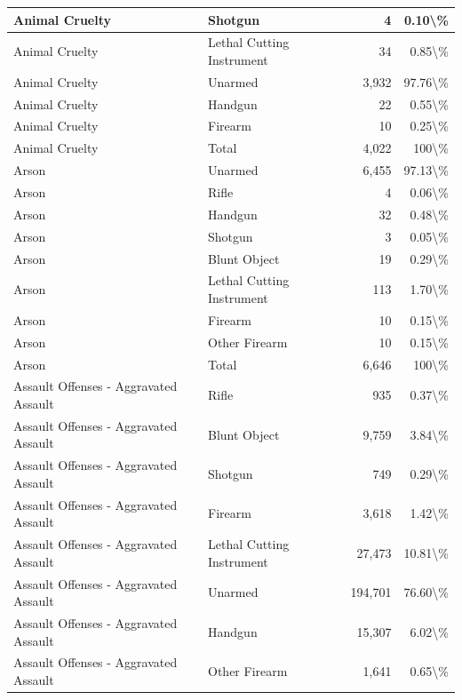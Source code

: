 \documentclass[
]{krantz}
\begin{document}
\begin{longtable}[t]{l|l|r|r}
\hline
Animal Cruelty & Shotgun & 4 & 0.10\textbackslash{}\%\\
\hline
Animal Cruelty & Lethal Cutting Instrument & 34 & 0.85\textbackslash{}\%\\
\hline
Animal Cruelty & Unarmed & 3,932 & 97.76\textbackslash{}\%\\
\hline
Animal Cruelty & Handgun & 22 & 0.55\textbackslash{}\%\\
\hline
Animal Cruelty & Firearm & 10 & 0.25\textbackslash{}\%\\
\hline
Animal Cruelty & Total & 4,022 & 100\textbackslash{}\%\\
\hline
Arson & Unarmed & 6,455 & 97.13\textbackslash{}\%\\
\hline
Arson & Rifle & 4 & 0.06\textbackslash{}\%\\
\hline
Arson & Handgun & 32 & 0.48\textbackslash{}\%\\
\hline
Arson & Shotgun & 3 & 0.05\textbackslash{}\%\\
\hline
Arson & Blunt Object & 19 & 0.29\textbackslash{}\%\\
\hline
Arson & Lethal Cutting Instrument & 113 & 1.70\textbackslash{}\%\\
\hline
Arson & Firearm & 10 & 0.15\textbackslash{}\%\\
\hline
Arson & Other Firearm & 10 & 0.15\textbackslash{}\%\\
\hline
Arson & Total & 6,646 & 100\textbackslash{}\%\\
\hline
Assault Offenses - Aggravated Assault & Rifle & 935 & 0.37\textbackslash{}\%\\
\hline
Assault Offenses - Aggravated Assault & Blunt Object & 9,759 & 3.84\textbackslash{}\%\\
\hline
Assault Offenses - Aggravated Assault & Shotgun & 749 & 0.29\textbackslash{}\%\\
\hline
Assault Offenses - Aggravated Assault & Firearm & 3,618 & 1.42\textbackslash{}\%\\
\hline
Assault Offenses - Aggravated Assault & Lethal Cutting Instrument & 27,473 & 10.81\textbackslash{}\%\\
\hline
Assault Offenses - Aggravated Assault & Unarmed & 194,701 & 76.60\textbackslash{}\%\\
\hline
Assault Offenses - Aggravated Assault & Handgun & 15,307 & 6.02\textbackslash{}\%\\
\hline
Assault Offenses - Aggravated Assault & Other Firearm & 1,641 & 0.65\textbackslash{}\%\\
\hline

\end{longtable}
\end{document}
